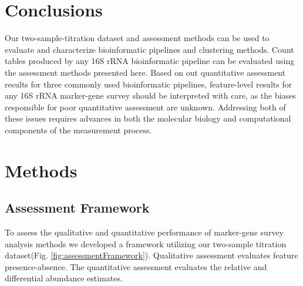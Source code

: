 \documentclass{bmcart}
\begin{document}
\section*{Conclusions}
Our two-sample-titration dataset and assessment methods can be used to evaluate and characterize bioinformatic pipelines and clustering methods.
Count tables produced by any 16S rRNA bioinformatic pipeline can be evaluated using the assessment methods presented here.
Based on out quantitative assessment results for three commonly used bioinformatic pipelines, feature-level results for any 16S rRNA marker-gene survey should be interpreted with care, as the biases responsible for poor quantitative assessment are unknown.
Addressing both of these issues requires advances in both the molecular biology and
computational components of the measurement process.





\section*{Methods}

\subsection*{Assessment Framework}
To assess the qualitative and quantitative performance of marker-gene survey analysis methods we developed a framework utilizing our two-sample titration dataset(Fig. \ref{fig:assessmentFramework}).
Qualitative assessment evaluates feature presence-absence.
The quantitative assessment evaluates the relative and differential abundance estimates.
\end{document}

